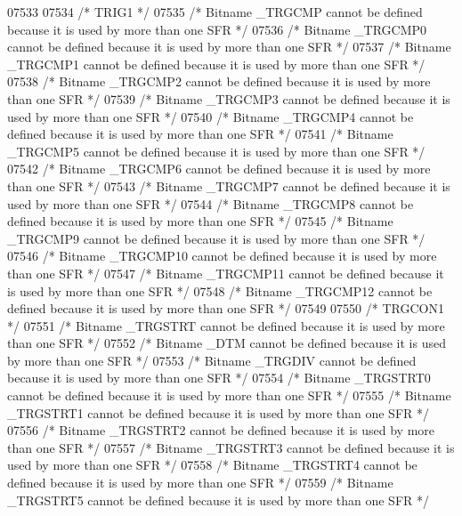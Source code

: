 \begin{DoxyCode}
07533 
07534 \textcolor{comment}{/* TRIG1 */}
07535 \textcolor{comment}{/* Bitname \_TRGCMP cannot be defined because it is used by more than one SFR */}
07536 \textcolor{comment}{/* Bitname \_TRGCMP0 cannot be defined because it is used by more than one SFR */}
07537 \textcolor{comment}{/* Bitname \_TRGCMP1 cannot be defined because it is used by more than one SFR */}
07538 \textcolor{comment}{/* Bitname \_TRGCMP2 cannot be defined because it is used by more than one SFR */}
07539 \textcolor{comment}{/* Bitname \_TRGCMP3 cannot be defined because it is used by more than one SFR */}
07540 \textcolor{comment}{/* Bitname \_TRGCMP4 cannot be defined because it is used by more than one SFR */}
07541 \textcolor{comment}{/* Bitname \_TRGCMP5 cannot be defined because it is used by more than one SFR */}
07542 \textcolor{comment}{/* Bitname \_TRGCMP6 cannot be defined because it is used by more than one SFR */}
07543 \textcolor{comment}{/* Bitname \_TRGCMP7 cannot be defined because it is used by more than one SFR */}
07544 \textcolor{comment}{/* Bitname \_TRGCMP8 cannot be defined because it is used by more than one SFR */}
07545 \textcolor{comment}{/* Bitname \_TRGCMP9 cannot be defined because it is used by more than one SFR */}
07546 \textcolor{comment}{/* Bitname \_TRGCMP10 cannot be defined because it is used by more than one SFR */}
07547 \textcolor{comment}{/* Bitname \_TRGCMP11 cannot be defined because it is used by more than one SFR */}
07548 \textcolor{comment}{/* Bitname \_TRGCMP12 cannot be defined because it is used by more than one SFR */}
07549 
07550 \textcolor{comment}{/* TRGCON1 */}
07551 \textcolor{comment}{/* Bitname \_TRGSTRT cannot be defined because it is used by more than one SFR */}
07552 \textcolor{comment}{/* Bitname \_DTM cannot be defined because it is used by more than one SFR */}
07553 \textcolor{comment}{/* Bitname \_TRGDIV cannot be defined because it is used by more than one SFR */}
07554 \textcolor{comment}{/* Bitname \_TRGSTRT0 cannot be defined because it is used by more than one SFR */}
07555 \textcolor{comment}{/* Bitname \_TRGSTRT1 cannot be defined because it is used by more than one SFR */}
07556 \textcolor{comment}{/* Bitname \_TRGSTRT2 cannot be defined because it is used by more than one SFR */}
07557 \textcolor{comment}{/* Bitname \_TRGSTRT3 cannot be defined because it is used by more than one SFR */}
07558 \textcolor{comment}{/* Bitname \_TRGSTRT4 cannot be defined because it is used by more than one SFR */}
07559 \textcolor{comment}{/* Bitname \_TRGSTRT5 cannot be defined because it is used by more than one SFR */}

\end{DoxyCode}
